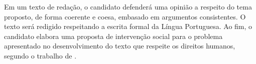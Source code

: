 \begin{longtable}{|c|l|l|}
\end{longtable}

Em um texto de redação, o candidato defenderá uma opinião a respeito do tema 
proposto, de forma coerente e coesa, embasado em argumentos consistentes. 
O texto será redigido respeitando a escrita formal da Língua Portuguesa. Ao 
fim, o candidato elabora uma proposta de intervenção social para o problema 
apresentado no desenvolvimento do texto que respeite os direitos humanos, 
segundo o trabalho de \cite{braga:2015}.

